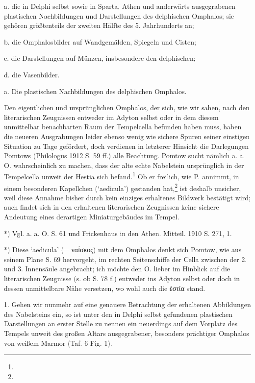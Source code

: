 \documentclass[a4paper, 11pt, oneside]{article}
\begin{document}
a. die in Delphi selbst sowie in Sparta, Athen und anderwärts ausgegrabenen plastischen Nachbildungen und Darstellungen des delphischen Omphalos; sie gehören größtenteils der zweiten Hälfte des 5. Jahrhunderts an;

b. die Omphalosbilder auf Wandgemälden, Spiegeln und Cisten;

c. die Darstellungen auf Münzen, insbesondere den delphischen;

d. die Vasenbilder.

a. Die plastischen Nachbildungen des delphischen Omphalos.

Den eigentlichen und ursprünglichen Omphalos, der sich, wie wir sahen, nach den literarischen Zeugnissen entweder im Adyton selbst oder in dem diesem unmittelbar benachbarten Raum der Tempelcella befunden haben muss, haben die neueren Ausgrabungen leider ebenso wenig wie sichere Spuren seiner einstigen Situation zu Tage gefördert, doch verdienen in letzterer Hinsicht die Darlegungen Pomtows (Philologus 1912 S. 59 ff.) alle Beachtung. Pomtow sucht nämlich a. a. O. wahrscheinlich zu machen, dass der alte echte Nabelstein ursprünglich in der Tempelcella unweit der Hestia sich befand.\footnote{} Ob er freilich, wie P. annimmt, in einem besonderen Kapellchen (`aedicula') gestanden hat,\footnote{} ist deshalb unsicher, weil diese Annahme bisher durch kein einziges erhaltenes Bildwerk bestätigt wird; auch findet sich in den erhaltenen literarischen Zeugnissen keine sichere Andeutung eines derartigen Miniaturgebäudes im Tempel.

*) Vgl. a. a. O. S. 61 und Frickenhaus in den Athen. Mitteil. 1910 S. 271, 1.

*) Diese `aedicula' (= ναΐσκος) mit dem Omphalos denkt sich Pomtow, wie aus seinem Plane S. 69 hervorgeht, im rechten Seitenschiffe der Cella zwischen der 2. und 3. Innensäule angebracht; ich möchte den O. lieber im Hinblick auf die literarischen Zeugnisse (s. ob S. 78 f.) entweder ins Adyton selbst oder doch in dessen unmittelbare Nähe versetzen, wo wohl auch die ἑστία stand.

1. Gehen wir nunmehr auf eine genauere Betrachtung der erhaltenen Abbildungen des Nabelsteins ein, so ist unter den in Delphi selbst gefundenen plastischen Darstellungen an erster Stelle zu nennen ein neuerdings auf dem Vorplatz des Tempels unweit des großen Altars ausgegrabener, besonders prächtiger Omphalos von weißem Marmor (Taf. 6 Fig. 1).
\end{document}
